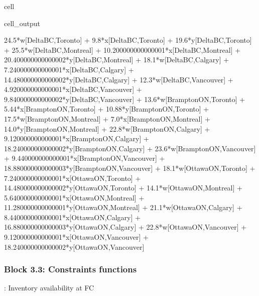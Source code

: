 \documentclass[letterpaper,10pt,english]{jupyterBook}
\begin{document}
\begin{sphinxuseclass}{cell}
\begin{sphinxVerbatimOutput}
\begin{sphinxuseclass}{cell_output}
\begin{sphinxVerbatim}[commandchars=\\\{\}]
24.5*w[Delta\PYGZhy{}BC,Toronto] + 9.8*x[Delta\PYGZhy{}BC,Toronto] + 19.6*y[Delta\PYGZhy{}BC,Toronto] + 25.5*w[Delta\PYGZhy{}BC,Montreal] + 10.200000000000001*x[Delta\PYGZhy{}BC,Montreal] + 20.400000000000002*y[Delta\PYGZhy{}BC,Montreal] + 18.1*w[Delta\PYGZhy{}BC,Calgary] + 7.240000000000001*x[Delta\PYGZhy{}BC,Calgary] + 14.480000000000002*y[Delta\PYGZhy{}BC,Calgary] + 12.3*w[Delta\PYGZhy{}BC,Vancouver] + 4.920000000000001*x[Delta\PYGZhy{}BC,Vancouver] + 9.840000000000002*y[Delta\PYGZhy{}BC,Vancouver] + 13.6*w[Brampton\PYGZhy{}ON,Toronto] + 5.44*x[Brampton\PYGZhy{}ON,Toronto] + 10.88*y[Brampton\PYGZhy{}ON,Toronto] + 17.5*w[Brampton\PYGZhy{}ON,Montreal] + 7.0*x[Brampton\PYGZhy{}ON,Montreal] + 14.0*y[Brampton\PYGZhy{}ON,Montreal] + 22.8*w[Brampton\PYGZhy{}ON,Calgary] + 9.120000000000001*x[Brampton\PYGZhy{}ON,Calgary] + 18.240000000000002*y[Brampton\PYGZhy{}ON,Calgary] + 23.6*w[Brampton\PYGZhy{}ON,Vancouver] + 9.440000000000001*x[Brampton\PYGZhy{}ON,Vancouver] + 18.880000000000003*y[Brampton\PYGZhy{}ON,Vancouver] + 18.1*w[Ottawa\PYGZhy{}ON,Toronto] + 7.240000000000001*x[Ottawa\PYGZhy{}ON,Toronto] + 14.480000000000002*y[Ottawa\PYGZhy{}ON,Toronto] + 14.1*w[Ottawa\PYGZhy{}ON,Montreal] + 5.640000000000001*x[Ottawa\PYGZhy{}ON,Montreal] + 11.280000000000001*y[Ottawa\PYGZhy{}ON,Montreal] + 21.1*w[Ottawa\PYGZhy{}ON,Calgary] + 8.440000000000001*x[Ottawa\PYGZhy{}ON,Calgary] + 16.880000000000003*y[Ottawa\PYGZhy{}ON,Calgary] + 22.8*w[Ottawa\PYGZhy{}ON,Vancouver] + 9.120000000000001*x[Ottawa\PYGZhy{}ON,Vancouver] + 18.240000000000002*y[Ottawa\PYGZhy{}ON,Vancouver]
\end{sphinxVerbatim}

\end{sphinxuseclass}\end{sphinxVerbatimOutput}

\end{sphinxuseclass}

\subsubsection{Block 3.3: Constraints functions}
\label{\detokenize{docs/Case2_1_Module1_Online_Fulfillment_Script:block-3-3-constraints-functions}}
\sphinxAtStartPar
{}: Inventory availability at FC 
\end{document}
